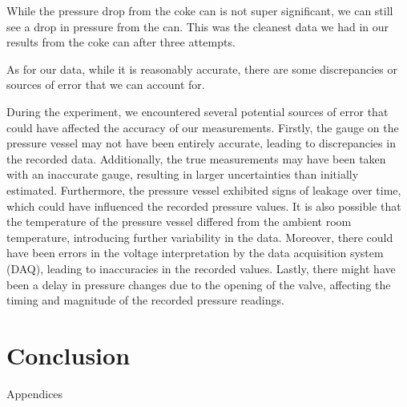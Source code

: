 \documentclass{article}
\begin{document}
While the pressure drop from the coke can is not super significant, we can still see a drop in pressure from the can. This was the cleanest data we had in our results from the coke can after three attempts.

As for our data, while it is reasonably accurate, there are some discrepancies or sources of error that we can account for.

During the experiment, we encountered several potential sources of error that could have affected the accuracy of our measurements. Firstly, the gauge on the pressure vessel may not have been entirely accurate, leading to discrepancies in the recorded data. Additionally, the true measurements may have been taken with an inaccurate gauge, resulting in larger uncertainties than initially estimated. Furthermore, the pressure vessel exhibited signs of leakage over time, which could have influenced the recorded pressure values. It is also possible that the temperature of the pressure vessel differed from the ambient room temperature, introducing further variability in the data. Moreover, there could have been errors in the voltage interpretation by the data acquisition system (DAQ), leading to inaccuracies in the recorded values. Lastly, there might have been a delay in pressure changes due to the opening of the valve, affecting the timing and magnitude of the recorded pressure readings.


\section{Conclusion}



\newpage
\thispagestyle{empty}  %
\begin{center}
	\vspace*{\fill}
	{\Huge Appendices}
	\vspace*{\fill}
\end{center}
\end{document}
